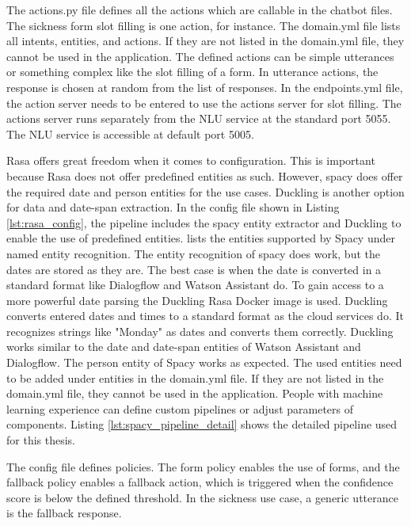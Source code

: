 The actions.py file defines all the actions which are callable in the chatbot files.
The sickness form slot filling is one action, for instance.
The domain.yml file lists all intents, entities, and actions.
If they are not listed in the domain.yml file, they cannot be used in the application.
The defined actions can be simple utterances or something complex like the slot filling of a form.
In utterance actions, the response is chosen at random from the list of responses.
In the endpoints.yml file, the action server needs to be entered to use the actions server for slot filling.
The actions server runs separately from the NLU service at the standard port 5055.
The NLU service is accessible at default port 5005.

Rasa offers great freedom when it comes to configuration.
This is important because Rasa does not offer predefined entities as such.
However, spacy does offer the required date and person entities for the use cases.
Duckling is another option for data and date-span extraction.
In the config file shown in Listing \ref{lst:rasa_config}, the pipeline includes the spacy entity extractor and Duckling to enable the use of predefined entities.
\citet{spacyapi} lists the entities supported by Spacy under named entity recognition.
The entity recognition of spacy does work, but the dates are stored as they are.
The best case is when the date is converted in a standard format like 
Dialogflow and Watson Assistant do.
To gain access to a more powerful date parsing the Duckling\cite{duckling} Rasa Docker image is used.
Duckling converts entered dates and times to a standard format as the cloud services do.
It recognizes strings like "Monday" as dates and converts them correctly.
Duckling works similar to the date and date-span entities of Watson Assistant and Dialogflow.
The person entity of Spacy works as expected.
The used entities need to be added under entities in the domain.yml file. If they are not listed in the domain.yml file, they cannot be used in the application.
People with machine learning experience can define custom pipelines or adjust parameters of components.
Listing \ref{lst:spacy_pipeline_detail} shows the detailed pipeline used for this thesis.

The config file defines policies.
The form policy enables the use of forms, and the fallback policy enables a fallback action, which is triggered when the confidence score is below the defined threshold. 
In the sickness use case, a generic utterance is the fallback response. 

